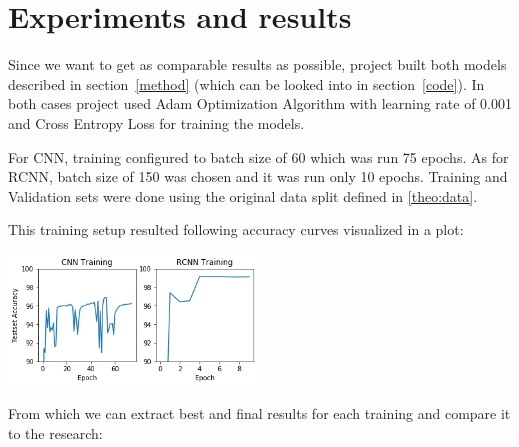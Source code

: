 \documentclass[article,11pt]{article}
\begin{document}
\section{Experiments and results}
Since we want to get as comparable results as possible, project built both models described in section~\ref{method} (which can be looked into in section~\ref{code}).
In both cases project used Adam Optimization Algorithm with learning rate of 0.001 and Cross Entropy Loss for training the models.

For CNN, training configured to batch size of 60 which was run 75 epochs. As for RCNN,
batch size of 150 was chosen and it was run only 10 epochs.
Training and Validation sets were done using the original data split
defined in \cref{theo:data}.

This training setup resulted following accuracy curves visualized in a plot:

\begin{center}
    \includegraphics[width=0.5\textwidth]{training}
    \label{fig:training}
\end{center}

From which we can extract best and final results for each training and compare it to the research:\\
\end{document}
